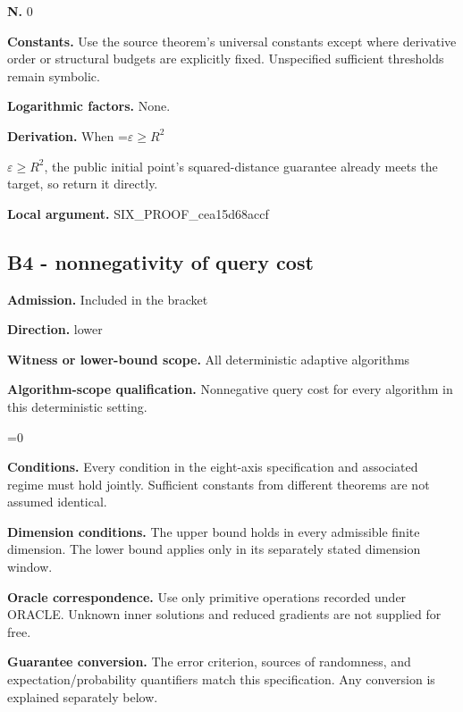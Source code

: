 \documentclass[10pt,a4paper]{article}
\newcommand{\AtlasMath}[1]{\par\begingroup\centering\setbox0=\hbox{$\displaystyle #1$}\ifdim\wd0>1.4\linewidth\typeout{ATLAS WIDE FORMULA: \the\wd0}\fi\ifdim\wd0>\linewidth\resizebox{\linewidth}{!}{\box0}\else\box0\fi\par\endgroup}
\newcommand{\AtlasInlineMath}[1]{\begingroup\setbox0=\hbox{$#1$}\ifdim\wd0>.4\linewidth\endgroup\AtlasMath{#1}\else\endgroup$#1$\fi}
\begin{document}
\textbf{N.} 0



\textbf{Constants.} Use the source theorem’s universal constants except where derivative order or structural budgets are explicitly fixed. Unspecified sufficient thresholds remain symbolic.



\textbf{Logarithmic factors.} None.



\textbf{Derivation.} When \AtlasInlineMath{\varepsilon\ge R^2}, the public initial point's squared-distance guarantee already meets the target, so return it directly.



\textbf{Local argument.} SIX\_PROOF\_cea15d68accf



\subsection{B4 - nonnegativity of query cost}


\textbf{Admission.} Included in the bracket



\textbf{Direction.} lower



\textbf{Witness or lower-bound scope.} All deterministic adaptive algorithms



\textbf{Algorithm-scope qualification.} Nonnegative query cost for every algorithm in this deterministic setting.



\AtlasMath{0}


\textbf{Conditions.} Every condition in the eight-axis specification and associated regime must hold jointly. Sufficient constants from different theorems are not assumed identical.



\textbf{Dimension conditions.} The upper bound holds in every admissible finite dimension. The lower bound applies only in its separately stated dimension window.



\textbf{Oracle correspondence.} Use only primitive operations recorded under ORACLE. Unknown inner solutions and reduced gradients are not supplied for free.



\textbf{Guarantee conversion.} The error criterion, sources of randomness, and expectation/probability quantifiers match this specification. Any conversion is explained separately below.
\end{document}
